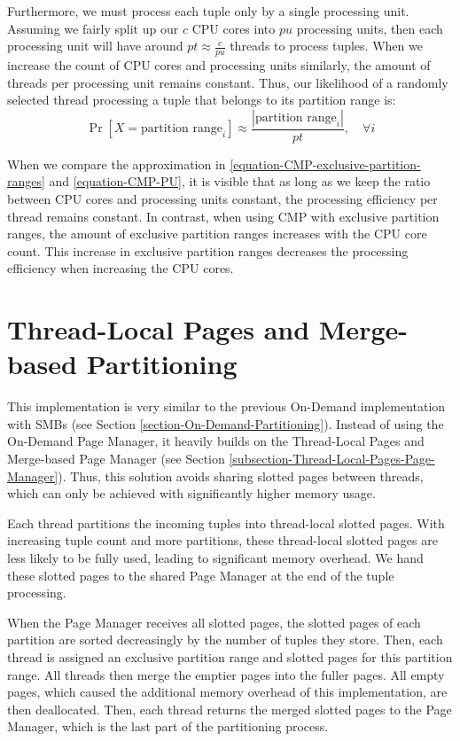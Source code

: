 Furthermore, we must process each tuple only by a single processing unit.
Assuming we fairly split up our $c$ \ac{CPU} cores into $pu$ processing units, then each processing unit will have around $pt\approx\frac{c}{pu}$ threads to process tuples.
When we increase the count of CPU cores and processing units similarly, the amount of threads per processing unit remains constant.
Thus, our likelihood of a randomly selected thread processing a tuple that belongs to its partition range is:
\begin{equation}\label{equation-CMP-PU}
  \Pr[X=\textrm{partition range}_i] \approx \frac{|\textrm{partition range}_i|}{pt},  \quad \forall i
\end{equation}

When we compare the approximation in \ref{equation-CMP-exclusive-partition-ranges} and \ref{equation-CMP-PU}, it is visible that as long as we keep the ratio between CPU cores and processing units constant, the processing efficiency per thread remains constant.
In contrast, when using \acl{CMP} with exclusive partition ranges, the amount of exclusive partition ranges increases with the CPU core count.
This increase in exclusive partition ranges decreases the processing efficiency when increasing the CPU cores.

\section{Thread-Local Pages and Merge-based Partitioning}
This implementation is very similar to the previous On-Demand implementation with \aclp{SMB} (see Section \ref{section-On-Demand-Partitioning}).
Instead of using the On-Demand Page Manager, it heavily builds on the Thread-Local Pages and Merge-based Page Manager (see Section \ref{subsection-Thread-Local-Pages-Page-Manager}).
Thus, this solution avoids sharing slotted pages between threads, which can only be achieved with significantly higher memory usage.

Each thread partitions the incoming tuples into thread-local slotted pages.
With increasing tuple count and more partitions, these thread-local slotted pages are less likely to be fully used, leading to significant memory overhead.
We hand these slotted pages to the shared Page Manager at the end of the tuple processing.

When the Page Manager receives all slotted pages, the slotted pages of each partition are sorted decreasingly by the number of tuples they store.
Then, each thread is assigned an exclusive partition range and slotted pages for this partition range.
All threads then merge the emptier pages into the fuller pages.
All empty pages, which caused the additional memory overhead of this implementation, are then deallocated.
Then, each thread returns the merged slotted pages to the Page Manager, which is the last part of the partitioning process.

